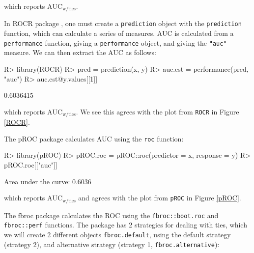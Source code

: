 \documentclass[12pt]{article}
\let\code=\texttt
\newcommand{\pkg}[1]{{\fontseries{b}\selectfont #1}}
\newenvironment{CodeChunk}{}{}
\begin{document}
which reports \(\text{AUC}_{\text{w/ties}}\).

In \pkg{ROCR} package \citep{ROCR}, one must create a \code{prediction}
object with the \code{prediction} function, which can calculate a series
of measures. AUC is calculated from a \code{performance} function,
giving a \code{performance} object, and giving the \texttt{"auc"}
measure. We can then extract the AUC as follows:

\begin{CodeChunk}

\begin{CodeInput}
R> library(ROCR)
R> pred = prediction(x, y)
R> auc.est = performance(pred, "auc")
R> auc.est@y.values[[1]]
\end{CodeInput}

\begin{CodeOutput}
[1] 0.6036415
\end{CodeOutput}
\end{CodeChunk}

which reports \(\text{AUC}_{\text{w/ties}}\). We see this agrees with
the plot from \texttt{ROCR} in Figure \ref{ROCR}.

The \pkg{pROC} \citep{pROC} package calculates AUC using the
\texttt{roc} function:

\begin{CodeChunk}

\begin{CodeInput}
R> library(pROC)
R> pROC.roc = pROC::roc(predictor = x, response = y)
R> pROC.roc[["auc"]]
\end{CodeInput}

\begin{CodeOutput}
Area under the curve: 0.6036
\end{CodeOutput}
\end{CodeChunk}

which reports \(\text{AUC}_{\text{w/ties}}\) and agrees with the plot
from \texttt{pROC} in Figure \ref{pROC}.

The \pkg{fbroc} package calculates the ROC using the
\texttt{fbroc::boot.roc} and \texttt{fbroc::perf} functions. The package
has 2 strategies for dealing with ties, which we will create 2 different
objects \texttt{fbroc.default}, using the default strategy (strategy 2),
and alternative strategy (strategy 1, \texttt{fbroc.alternative}):
\end{document}
